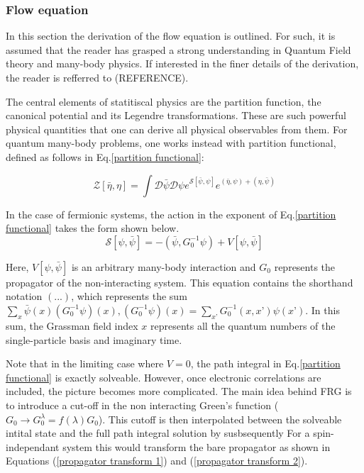 \documentclass[12pt]{article}
\begin{document}
\subsubsection{Flow equation}
\label{subsubsec:Flow Equation}

In this section the derivation of the flow equation is outlined. For such, it is assumed that the reader has grasped a strong understanding in Quantum Field theory and many-body physics.
If interested in the finer details of the derivation, the reader is refferred to (REFERENCE). \par
\medskip
\noindent The central elements of statitiscal physics are the partition function, the canonical potential and its Legendre transformations. 
These are such powerful physical quantities that one can derive all physical observables from them.
For quantum many-body problems, one works instead with partition functional, defined as follows in Eq.\ref{partition functional}:

\begin{equation}\label{partition functional}
    \mathcal{Z}[\bar{\eta}, \eta] = \int \mathcal{D} \bar{\psi} \mathcal{D}\psi e^{\mathcal{S}[\bar{\psi}, \psi]}e^{(\bar{\eta}, \psi)+(\eta, \bar{\psi})}
\end{equation}

\noindent In the case of fermionic systems, the action in the exponent of Eq.\ref{partition functional} takes the form shown below.
\begin{equation} \label{action}
    \mathcal{S}[\psi, \bar{\psi}] = -(\bar{\psi}, G_0^{-1} \psi) + V[\psi, \bar{\psi}]
\end{equation}

\noindent Here, $V[\psi, \bar{\psi}]$ is an arbitrary many-body interaction and $G_0$ represents the propagator of the non-interacting system. This equation contains the shorthand notation $(...)$, which represents the sum $\sum_x \bar{\psi}(x)(G_0^{-1}\psi)(x), (G_0^{-1}\psi)(x) = \sum_{x’}G_0^{-1}(x,x’)\psi(x’)$. In this sum, the Grassman field index $x$ represents all the quantum numbers of the single-particle basis and imaginary time.\par
\medskip

\noindent Note that in the limiting case where $V=0$, the path integral in Eq.\ref{partition functional} is exactly solveable. 
However, once electronic correlations are included, the picture becomes more complicated. 
The main idea behind FRG is to introduce a cut-off in the non interacting Green's function ($G_0 \rightarrow G_0^{\lambda} = f(\lambda)G_0$). 
This cutoff is then interpolated between the solveable intital state and the full path integral solution by susbsequently For a spin-independant system this would transform the 
bare propagator as shown in Equations (\ref{propagator transform 1}) and (\ref{propagator transform 2}). 
\end{document}
